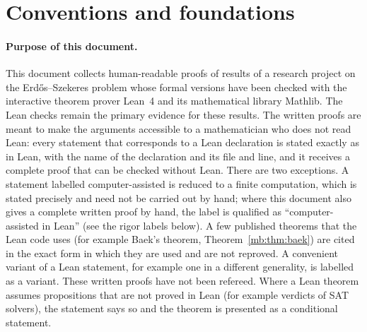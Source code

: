 \section{Conventions and foundations}\label{fd:sec}

\paragraph{Purpose of this document.}
This document collects human-readable proofs of results of a research project on the
Erd\H{o}s--Szekeres problem whose formal versions have been checked with the interactive theorem prover
Lean~4 and its mathematical library Mathlib. The Lean checks remain the primary evidence for these results. The
written proofs are meant to make the arguments accessible to a mathematician who does not read Lean:
every statement that corresponds to a Lean declaration is stated exactly as in Lean, with the name of
the declaration and its file and line, and it receives a complete proof that can be checked without
Lean. There are two exceptions. A statement labelled computer-assisted is reduced to a finite
computation, which is stated precisely and need not be carried out by hand; where this document also
gives a complete written proof by hand, the label is qualified as ``computer-assisted in Lean'' (see the
rigor labels below). A few
published theorems that the Lean code uses (for example Baek's theorem, Theorem~\ref{mb:thm:baek}) are
cited in the exact form in which they are used and are not reproved. A convenient variant of a Lean
statement, for example one in a different generality, is labelled as a variant. These written proofs
have not been refereed. Where a Lean theorem assumes propositions that are not proved in Lean (for
example verdicts of SAT solvers), the statement says so and the theorem is presented as a conditional
statement.

